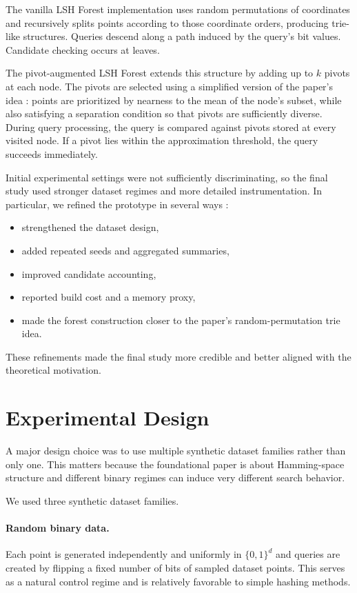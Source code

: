 \documentclass[11pt]{article}
\begin{document}
The vanilla LSH Forest implementation uses random permutations of coordinates and recursively splits points according to those coordinate orders, producing trie-like structures. Queries descend along a path induced by the query's bit values. Candidate checking occurs at leaves.

The pivot-augmented LSH Forest extends this structure by adding up to $k$ pivots at each node. The pivots are selected using a simplified version of the paper's idea : points are prioritized by nearness to the mean of the node's subset, while also satisfying a separation condition so that pivots are sufficiently diverse. During query processing, the query is compared against pivots stored at every visited node. If a pivot lies within the approximation threshold, the query succeeds immediately.

Initial experimental settings were not sufficiently discriminating, so the final study used stronger dataset regimes and more detailed instrumentation. In particular, we refined the prototype in several ways :
\begin{itemize}[leftmargin=*]
    \item strengthened the dataset design,
    \item added repeated seeds and aggregated summaries,
    \item improved candidate accounting,
    \item reported build cost and a memory proxy,
    \item made the forest construction closer to the paper's random-permutation trie idea.
\end{itemize}
These refinements made the final study more credible and better aligned with the theoretical motivation.

\section{Experimental Design}

A major design choice was to use multiple synthetic dataset families rather than only one. This matters because the foundational paper is about Hamming-space structure and different binary regimes can induce very different search behavior.

We used three synthetic dataset families.

\paragraph{Random binary data.} Each point is generated independently and uniformly in $\{0,1\}^d$ and queries are created by flipping a fixed number of bits of sampled dataset points. This serves as a natural control regime and is relatively favorable to simple hashing methods.
\end{document}
